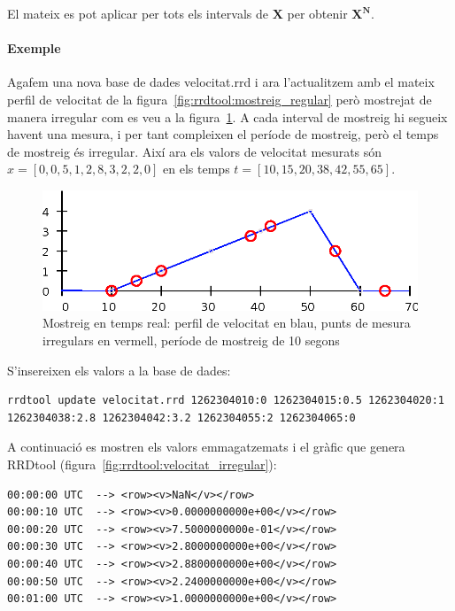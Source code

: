 El mateix es pot aplicar per tots els intervals de $\mathbf{X}$ per obtenir $\mathbf{X^N}$.



\paragraph{Exemple}


Agafem una nova base de dades velocitat.rrd i ara l'actualitzem amb el mateix perfil de velocitat de la figura~\ref{fig:rrdtool:mostreig_regular} però mostrejat de manera irregular com es veu a la figura~\ref{fig:rrdtool:mostreig_irregular}. A cada interval de mostreig hi segueix havent una mesura, i per tant compleixen el període de mostreig, però el temps de mostreig és irregular. Així ara els valors de velocitat mesurats són $x=[0, 0{,}5 , 1 , 2{,}8 , 3{,}2 , 2 , 0]$ en els temps $t=[10,15,20,38,42,55,65]$.


\begin{figure}[htp]
  \centering
  \includegraphics[width=\textwidth]{imatges/rrdtool/mostreig_irregular.eps}
  \caption{Mostreig en temps real: perfil de velocitat en blau, punts de mesura irregulars en vermell, període de mostreig de 10 segons}
  \label{fig:rrdtool:mostreig_irregular}
\end{figure}

S'insereixen els valors a la base de dades:
\begin{lstlisting}[style=sh]
rrdtool update velocitat.rrd 1262304010:0 1262304015:0.5 1262304020:1 1262304038:2.8 1262304042:3.2 1262304055:2 1262304065:0
\end{lstlisting}

A continuació es mostren els valors emmagatzemats i el gràfic que genera RRDtool (figura~\ref{fig:rrdtool:velocitat_irregular}):
\begin{lstlisting}
00:00:00 UTC  --> <row><v>NaN</v></row>
00:00:10 UTC  --> <row><v>0.0000000000e+00</v></row>
00:00:20 UTC  --> <row><v>7.5000000000e-01</v></row>
00:00:30 UTC  --> <row><v>2.8000000000e+00</v></row>
00:00:40 UTC  --> <row><v>2.8800000000e+00</v></row>
00:00:50 UTC  --> <row><v>2.2400000000e+00</v></row>
00:01:00 UTC  --> <row><v>1.0000000000e+00</v></row>
\end{lstlisting}


